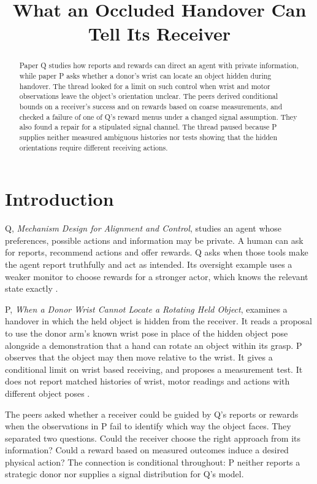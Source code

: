 \documentclass{article}
\title{What an Occluded Handover Can Tell Its Receiver}
\begin{document}
\maketitle

\begin{abstract}
Paper Q studies how reports and rewards can direct an agent with private information, while paper P
asks whether a donor's wrist can locate an object hidden during handover. The thread looked for a
limit on such control when wrist and motor observations leave the object's orientation unclear. The
peers derived conditional bounds on a receiver's success and on rewards based on coarse
measurements, and checked a failure of one of Q's reward menus under a changed signal assumption.
They also found a repair for a stipulated signal channel. The thread paused because P supplies
neither measured ambiguous histories nor tests showing that the hidden orientations require
different receiving actions.
\end{abstract}

\section{Introduction}

Q, \emph{Mechanism Design for Alignment and Control}, studies an agent whose preferences, possible
actions and information may be private. A human can ask for reports, recommend actions and offer
rewards. Q asks when those tools make the agent report truthfully and act as intended. Its oversight
example uses a weaker monitor to choose rewards for a stronger actor, which knows the relevant state
exactly \cite{Q}.

P, \emph{When a Donor Wrist Cannot Locate a Rotating Held Object}, examines a handover in which the
held object is hidden from the receiver. It reads a proposal to use the donor arm's known wrist pose
in place of the hidden object pose alongside a demonstration that a hand can rotate an object within
its grasp. P observes that the object may then move relative to the wrist. It gives a conditional
limit on wrist based receiving, and proposes a measurement test. It does not report matched
histories of wrist, motor readings and actions with different object poses \cite{P}.

The peers asked whether a receiver could be guided by Q's reports or rewards when the observations
in P fail to identify which way the object faces. They separated two questions. Could the receiver
choose the right approach from its information? Could a reward based on measured outcomes induce a
desired physical action? The connection is conditional throughout: P neither reports a strategic
donor nor supplies a signal distribution for Q's model.
\end{document}
